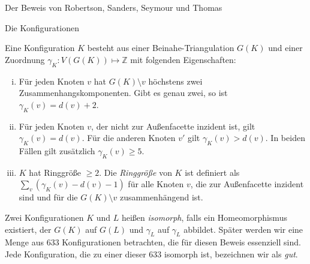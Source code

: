 \begin{chapter}{Der Beweis von Robertson, Sanders, Seymour und Thomas}
\begin{section}{Die Konfigurationen}
  \begin{definition}[Konfiguration]
   Eine Konfiguration $K$ besteht aus einer Beinahe-Triangulation $G(K)$ und einer Zuordnung $\gamma_K : V(G(K)) \mapsto \mathbb{Z}$ mit folgenden Eigenschaften:
   \begin{enumerate}[i)]
    \item Für jeden Knoten $v$ hat $G(K) \setminus v$ höchstens zwei Zusammenhangskomponenten. Gibt es genau zwei, so ist $\gamma_K(v) = d(v) + 2$.
    \item Für jeden Knoten $v$, der nicht zur Außenfacette inzident ist, gilt $\gamma_K(v) = d(v)$. Für die anderen Knoten $v'$ gilt $\gamma_K(v) > d(v)$. In beiden Fällen gilt zusätzlich $\gamma_K(v) \geq 5$.
    \item $K$ hat Ringgröße $\geq 2$. Die \textit{Ringgröße} von $K$ ist definiert als $\sum_v (\gamma_K(v) - d(v) - 1)$ für alle Knoten $v$, die zur Außenfacette inzident sind und für die $G(K) \setminus v$ zusammenhängend ist.
   \end{enumerate}
   
   Zwei Konfigurationen $K$ und $L$ heißen \textit{isomorph}, falls ein Homeomorphismus existiert, der $G(K)$ auf $G(L)$ und $\gamma_L$ auf $\gamma_L$ abbildet. Später werden wir eine Menge aus 633 Konfigurationen betrachten, die für diesen Beweis essenziell sind. Jede Konfiguration, die zu einer dieser 633 isomorph ist, bezeichnen wir als \textit{gut}. 

  \end{definition}


  \end{section}
 
\end{chapter}
